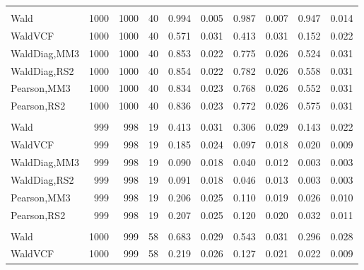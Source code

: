 \documentclass[
]{article}
\begin{document}
\begin{table}[H]
{\begin{tabular}[t]{lrrrrrrlrr}
\addlinespace[0.3em]
\multicolumn{10}{l}{\textbf{1F 15V}}\\
\hspace{1em}Wald & 1000 & 1000 & 40 & 0.994 & 0.005 & 0.987 & 0.007 & 0.947 & 0.014\\
\hspace{1em}WaldVCF & 1000 & 1000 & 40 & 0.571 & 0.031 & 0.413 & 0.031 & 0.152 & 0.022\\
\hspace{1em}WaldDiag,MM3 & 1000 & 1000 & 40 & 0.853 & 0.022 & 0.775 & 0.026 & 0.524 & 0.031\\
\hspace{1em}WaldDiag,RS2 & 1000 & 1000 & 40 & 0.854 & 0.022 & 0.782 & 0.026 & 0.558 & 0.031\\
\hspace{1em}Pearson,MM3 & 1000 & 1000 & 40 & 0.834 & 0.023 & 0.768 & 0.026 & 0.552 & 0.031\\
\hspace{1em}Pearson,RS2 & 1000 & 1000 & 40 & 0.836 & 0.023 & 0.772 & 0.026 & 0.575 & 0.031\\
\addlinespace[0.3em]
\multicolumn{10}{l}{\textbf{2F 10V}}\\
\hspace{1em}Wald & 999 & 998 & 19 & 0.413 & 0.031 & 0.306 & 0.029 & 0.143 & 0.022\\
\hspace{1em}WaldVCF & 999 & 998 & 19 & 0.185 & 0.024 & 0.097 & 0.018 & 0.020 & 0.009\\
\hspace{1em}WaldDiag,MM3 & 999 & 998 & 19 & 0.090 & 0.018 & 0.040 & 0.012 & 0.003 & 0.003\\
\hspace{1em}WaldDiag,RS2 & 999 & 998 & 19 & 0.091 & 0.018 & 0.046 & 0.013 & 0.003 & 0.003\\
\hspace{1em}Pearson,MM3 & 999 & 998 & 19 & 0.206 & 0.025 & 0.110 & 0.019 & 0.026 & 0.010\\
\hspace{1em}Pearson,RS2 & 999 & 998 & 19 & 0.207 & 0.025 & 0.120 & 0.020 & 0.032 & 0.011\\
\addlinespace[0.3em]
\multicolumn{10}{l}{\textbf{3F 15V}}\\
\hspace{1em}Wald & 1000 & 999 & 58 & 0.683 & 0.029 & 0.543 & 0.031 & 0.296 & 0.028\\
\hspace{1em}WaldVCF & 1000 & 999 & 58 & 0.219 & 0.026 & 0.127 & 0.021 & 0.022 & 0.009\\

\end{tabular}}
\end{table}
\end{document}
